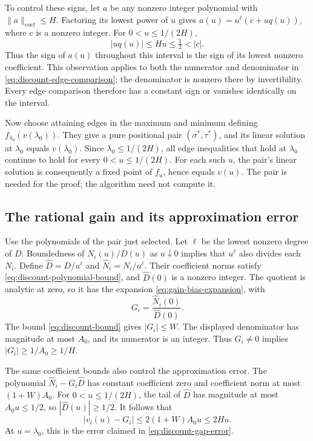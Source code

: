 To control these signs, let $a$ be any nonzero integer polynomial with
$\|a\|_{\mathrm{coef}}\le H$. Factoring its lowest power of $u$ gives
$a(u)=u^\ell(c+u q(u))$, where $c$ is a nonzero integer. For
$0<u\le1/(2H)$,
\[
                   |u q(u)|\le Hu\le\tfrac12<|c|.
\]
Thus the sign of $a(u)$ throughout this interval is the sign of its
lowest nonzero coefficient. This observation applies to both the
numerator and denominator in \eqref{eq:discount-edge-comparison};
the denominator is nonzero there by invertibility. Every edge comparison
therefore has a constant sign or vanishes identically on the interval.

Now choose attaining edges in the maximum and minimum defining
$f_{\lambda_0}(v(\lambda_0))$. They give a pure positional pair
$(\sigma^*,\tau^*)$, and its linear solution at $\lambda_0$ equals
$v(\lambda_0)$. Since $\lambda_0\le1/(2H)$, all edge inequalities
that hold at $\lambda_0$ continue to hold for every $0<u\le1/(2H)$.
For each such $u$, the pair's linear solution is consequently a fixed
point of $f_u$, hence equals $v(u)$. The pair is needed for the proof;
the algorithm need not compute it.

\subsection{The rational gain and its approximation error}

Use the polynomials of the pair just selected. Let $\ell$ be the lowest
nonzero degree of $D$. Boundedness of $N_i(u)/D(u)$ as $u\downarrow0$
implies that $u^\ell$ also divides each $N_i$. Define
$\widehat D=D/u^\ell$ and $\widehat N_i=N_i/u^\ell$.
Their coefficient norms satisfy \eqref{eq:discount-polynomial-bound},
and $\widehat D(0)$ is a nonzero integer. The quotient is analytic at
zero, so it has the expansion \eqref{eq:gain-bias-expansion}, with
\begin{equation}
                         G_i=\frac{\widehat N_i(0)}{\widehat D(0)}.
\label{eq:rational-gain}
\end{equation}
The bound \eqref{eq:discount-bound} gives $|G_i|\le W$. The displayed
denominator has magnitude at most $A_0$, and its numerator is an
integer. Thus $G_i\ne0$ implies $|G_i|\ge1/A_0\ge1/H$.

The same coefficient bounds also control the approximation error.
The polynomial $\widehat N_i-G_i\widehat D$ has constant coefficient
zero and coefficient norm at most $(1+W)A_0$. For
$0<u\le1/(2H)$, the tail of $\widehat D$ has magnitude at most
$A_0u\le1/2$, so $|\widehat D(u)|\ge1/2$. It follows that
\begin{equation}
 |v_i(u)-G_i|
   \le 2(1+W)A_0u
   \le 2Hu.
\label{eq:uniform-discount-error}
\end{equation}
At $u=\lambda_0$, this is the error claimed in
\eqref{eq:discount-gap-error}.

